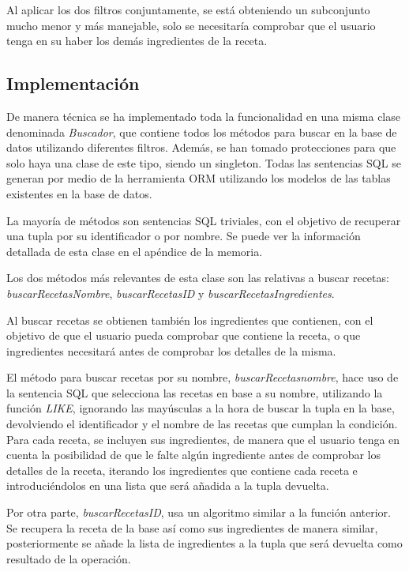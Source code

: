 Al aplicar los dos filtros conjuntamente, se está obteniendo un subconjunto mucho menor y más manejable, solo se necesitaría comprobar que el usuario tenga en su haber los demás ingredientes de la receta.

\subsection{Implementación}
De manera técnica se ha implementado toda la funcionalidad en una misma clase denominada \textit{Buscador}, que contiene todos los métodos para buscar en la base de datos utilizando diferentes filtros. Además, se han tomado protecciones para que solo haya una clase de este tipo, siendo un \gls{singleton}. Todas las sentencias \gls{SQL} se generan por medio de la herramienta \gls{ORM} utilizando los modelos de las tablas existentes en la base de datos.

La mayoría de métodos son sentencias \gls{SQL} triviales, con el objetivo de recuperar una \gls{tupla} por su identificador o por nombre. Se puede ver la información detallada de esta clase en el apéndice de la memoria.

Los dos métodos más relevantes de esta clase son las relativas a buscar recetas: \textit{buscarRecetasNombre}, \textit{buscarRecetasID} y \textit{buscarRecetasIngredientes}.

Al buscar recetas se obtienen también los ingredientes que contienen, con el objetivo de que el usuario pueda comprobar que contiene la receta, o que ingredientes necesitará antes de comprobar los detalles de la misma.

El método para buscar recetas por su nombre, \textit{buscarRecetasnombre}, hace uso de la sentencia \gls{SQL} que selecciona las recetas en base a su nombre, utilizando la función \textit{LIKE},  ignorando las mayúsculas a la hora de buscar la \gls{tupla} en la \gls{base}, devolviendo el identificador y el nombre de las recetas que cumplan la condición.
Para cada receta, se incluyen sus ingredientes, de manera que el usuario tenga en cuenta la posibilidad de que le falte algún ingrediente antes de comprobar los detalles de la receta, iterando los ingredientes que contiene cada receta e introduciéndolos en una lista que será añadida a la \gls{tupla} devuelta.

Por otra parte, \textit{buscarRecetasID}, usa un algoritmo similar a la función anterior. Se recupera la receta de la \gls{base} así como sus ingredientes de manera similar, posteriormente se añade la lista de ingredientes a la \gls{tupla} que será devuelta como resultado de la operación. 

